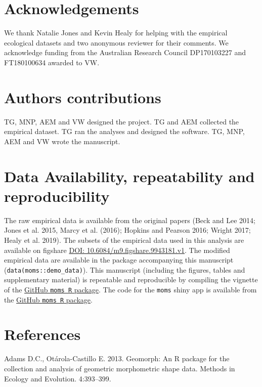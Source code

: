 \documentclass[]{article}
\begin{document}
\section{Acknowledgements}\label{acknowledgements}

We thank Natalie Jones and Kevin Healy for helping with the empirical
ecological datasets and two anonymous reviewer for their comments. We
acknowledge funding from the Australian Research Council DP170103227 and
FT180100634 awarded to VW.

\section{Authors contributions}\label{authors-contributions}

TG, MNP, AEM and VW designed the project. TG and AEM collected the
empirical dataset. TG ran the analyses and designed the software. TG,
MNP, AEM and VW wrote the manuscript.

\section{Data Availability, repeatability and
reproducibility}\label{data-availability-repeatability-and-reproducibility}

The raw empirical data is available from the original papers (Beck and
Lee 2014; Jones et al. 2015, Marcy et al. (2016); Hopkins and Pearson
2016; Wright 2017; Healy et al. 2019). The subsets of the empirical data
used in this analysis are available on figshare
\href{https://doi.org/10.6084/m9.figshare.9943181.v1}{DOI:
10.6084/m9.figshare.9943181.v1}. The modified empirical data are
available in the package accompanying this manuscript
(\texttt{data(moms::demo\_data)}). This manuscript (including the
figures, tables and supplementary material) is repeatable and
reproducible by compiling the vignette of the
\href{https://github/TGuillerme/moms}{GitHub \texttt{moms\ R} package}.
The code for the \texttt{moms} shiny app is available from the
\href{https://github/TGuillerme/moms}{GitHub \texttt{moms\ R} package}.

\section*{References}\label{references}

\hypertarget{refs}{}
\hypertarget{ref-adams2013geomorph}{}
Adams D.C., Otárola-Castillo E. 2013. Geomorph: An R package for the
collection and analysis of geometric morphometric shape data. Methods in
Ecology and Evolution. 4:393--399.
\end{document}
